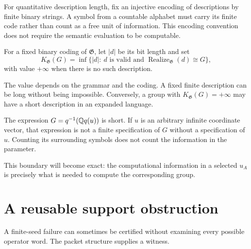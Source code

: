 For quantitative description length, fix an injective encoding of descriptions by finite binary strings. A symbol from a countable alphabet must carry its finite code rather than count as a free unit of information. This encoding convention does not require the semantic evaluation to be computable.

\begin{definition}
For a fixed binary coding of $\mathfrak G$, let $\lvert d\rvert$ be its bit length and set
\[
K_{\mathfrak G}(G)=\inf\{\lvert d\rvert:\ d\text{ is valid and }\operatorname{Realize}_{\mathfrak G}(d)\cong G\},
\]
with value $+\infty$ when there is no such description.
\end{definition}
The value depends on the grammar and the coding. A fixed finite description can be long without being impossible. Conversely, a group with $K_{\mathfrak G}(G)=+\infty$ may have a short description in an expanded language.

\begin{boundary}
The expression $G=q^{-1}(\mathbb Q q(u))$ is short. If $u$ is an arbitrary infinite coordinate vector, that expression is not a finite specification of $G$ without a specification of $u$. Counting its surrounding symbols does not count the information in the parameter.
\end{boundary}
This boundary will become exact: the computational information in a selected $u_A$ is precisely what is needed to compute the corresponding group.

\section{A reusable support obstruction}
A finite-seed failure can sometimes be certified without examining every possible operator word. The packet structure supplies a witness.

